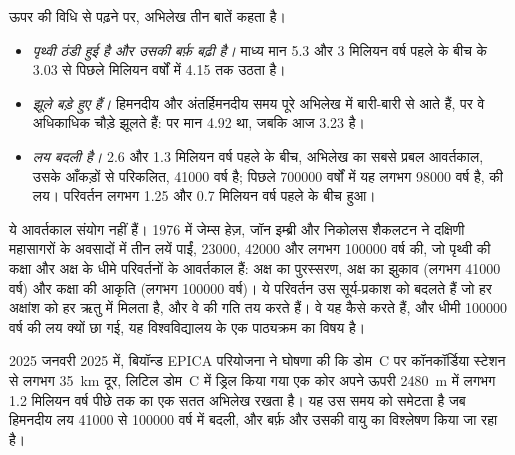 ऊपर की विधि से पढ़ने पर, अभिलेख तीन बातें कहता है।
\begin{itemize}
  \item \emph{पृथ्वी ठंडी हुई है और उसकी बर्फ़ बढ़ी है।} माध्य मान
        5.3 और 3 मिलियन वर्ष पहले के बीच के \qty{3.03}{\permil} से
        पिछले मिलियन वर्षों में \qty{4.15}{\permil} तक उठता है।
  \item \emph{झूले बड़े हुए हैं।} हिमनदीय और अंतर्हिमनदीय समय
        पूरे अभिलेख में बारी-बारी से आते हैं, पर वे अधिकाधिक चौड़े झूलते हैं:
         पर मान \qty{4.92}{\permil} था, जबकि
        आज \qty{3.23}{\permil} है।
  \item \emph{लय बदली है।} 2.6 और 1.3 मिलियन वर्ष
        पहले के बीच, अभिलेख का सबसे प्रबल आवर्तकाल, उसके आँकड़ों से परिकलित,
        \num{41000} वर्ष है; पिछले \num{700000} वर्षों में यह लगभग
        \num{98000} वर्ष है,  की लय। परिवर्तन लगभग 1.25 और 0.7 मिलियन वर्ष पहले के
        बीच हुआ।
\end{itemize}

ये आवर्तकाल संयोग नहीं हैं। 1976 में जेम्स हेज़, जॉन इम्ब्री और निकोलस
शैकलटन ने दक्षिणी महासागरों के अवसादों में तीन लयें पाईं,
\num{23000}, \num{42000} और लगभग \num{100000} वर्ष की, जो
पृथ्वी की कक्षा और अक्ष के धीमे परिवर्तनों के आवर्तकाल हैं: अक्ष का पुरस्सरण,
अक्ष का झुकाव (लगभग \num{41000} वर्ष) और कक्षा की आकृति
(लगभग \num{100000} वर्ष)। ये परिवर्तन उस सूर्य-प्रकाश को बदलते हैं जो हर
अक्षांश को हर ऋतु में मिलता है, और वे  की गति तय करते हैं। वे यह कैसे करते हैं, और धीमी \num{100000} वर्ष की लय क्यों
छा गई, यह विश्वविद्यालय के एक पाठ्यक्रम का विषय है।

\begin{dated}{2025}
जनवरी 2025 में, बियॉन्ड EPICA परियोजना ने घोषणा की कि डोम~C पर
कॉनकॉर्डिया स्टेशन से लगभग \qty{35}{km} दूर, लिटिल डोम~C में ड्रिल किया गया एक कोर अपने ऊपरी
\qty{2480}{m} में लगभग 1.2 मिलियन वर्ष पीछे तक का एक सतत अभिलेख रखता है।
यह उस समय को समेटता है
जब हिमनदीय लय \num{41000} से \num{100000} वर्ष में बदली, और
बर्फ़ और उसकी वायु का विश्लेषण किया जा रहा है।
\end{dated}

